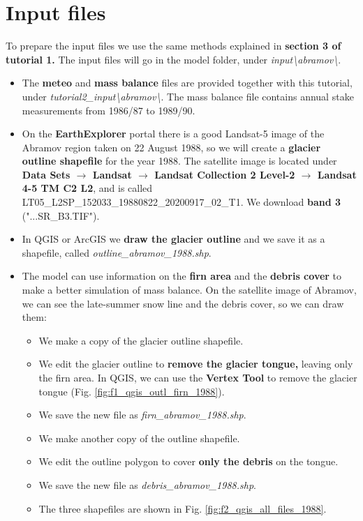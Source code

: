 \documentclass[15pt]{extarticle}
\begin{document}
\clearpage
\section{Input files}
To prepare the input files we use the same methods explained in \textbf{section 3 of tutorial 1.} The input files will go in the model folder, under \textit{input\textbackslash abramov\textbackslash}.

\begin{itemize}
    \item The \textbf{meteo} and \textbf{mass balance} files are provided together with this tutorial, under \textit{tutorial2\_input\textbackslash abramov\textbackslash}. The mass balance file contains annual stake measurements from 1986/87 to 1989/90.
    \item On the \textbf{EarthExplorer} portal there is a good Landsat-5 image of the Abramov region taken on 22 August 1988, so we will create a \textbf{glacier outline shapefile} for the year 1988. The satellite image is located under \textbf{Data Sets $\rightarrow$ Landsat $\rightarrow$ Landsat Collection 2 Level-2 $\rightarrow$ Landsat 4-5 TM C2 L2}, and is called\\ LT05\_L2SP\_152033\_19880822\_20200917\_02\_T1. We download \textbf{band 3} ("...SR\_B3.TIF").
    \item In QGIS or ArcGIS we \textbf{draw the glacier outline} and we save it as a shapefile, called \textit{outline\_abramov\_1988.shp}.
    \item The model can use information on the \textbf{firn area} and the \textbf{debris cover} to make a better simulation of mass balance. On the satellite image of Abramov, we can see the late-summer snow line and the debris cover, so we can draw them:
    \begin{itemize}
        \item We make a copy of the glacier outline shapefile.
        \item We edit the glacier outline to \textbf{remove the glacier tongue,} leaving only the firn area. In QGIS, we can use the \textbf{Vertex Tool} to remove the glacier tongue (Fig. \ref{fig:f1_qgis_outl_firn_1988}).
        \item We save the new file as \textit{firn\_abramov\_1988.shp}.
        \item We make another copy of the outline shapefile.
        \item We edit the outline polygon to cover \textbf{only the debris} on the tongue.
        \item We save the new file as \textit{debris\_abramov\_1988.shp}.
        \item The three shapefiles are shown in Fig. \ref{fig:f2_qgis_all_files_1988}.
    \end{itemize}
    

\end{itemize}
\end{document}
